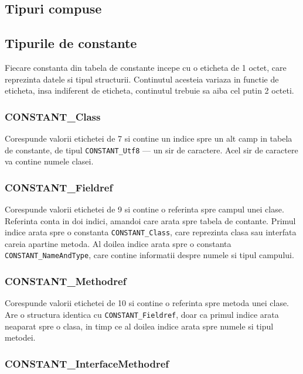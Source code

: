 \subsection{Tipuri compuse}

\subsection{Tipurile de constante}

Fiecare constanta din tabela de constante incepe cu o eticheta de 1
octet, care reprezinta datele si tipul structurii. Continutul acesteia
variaza in functie de eticheta, insa indiferent de eticheta, continutul
trebuie sa aiba cel putin 2 octeti.

\subsubsection{CONSTANT\_Class}

Corespunde valorii etichetei de 7 si contine un indice spre un alt camp
in tabela de constante, de tipul \texttt{CONSTANT\_Utf8} --- un sir de
caractere. Acel sir de caractere va contine numele clasei.

\subsubsection{CONSTANT\_Fieldref}

Corespunde valorii etichetei de 9 si contine o referinta spre campul
unei clase. Referinta conta in doi indici, amandoi care arata spre
tabela de contante. Primul indice arata spre o constanta
\texttt{CONSTANT\_Class}, care reprezinta clasa sau interfata careia
apartine metoda. Al doilea indice arata spre o constanta
\texttt{CONSTANT\_NameAndType}, care contine informatii despre numele si
tipul campului.

\subsubsection{CONSTANT\_Methodref}

Corespunde valorii etichetei de 10 si contine o referinta spre metoda
unei clase. Are o structura identica cu \texttt{CONSTANT\_Fieldref},
doar ca primul indice arata neaparat spre o clasa, in timp ce al doilea
indice arata spre numele si tipul metodei.

\subsubsection{CONSTANT\_InterfaceMethodref}

